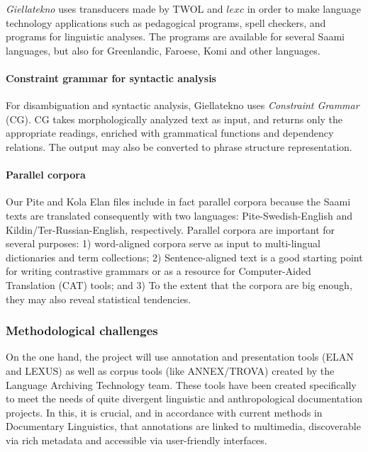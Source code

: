 \documentclass[a4paper,12pt]{article}
\begin{document}
\textit{Giellatekno} uses transducers made by TWOL and $lexc$ in order to make language technology applications such as pedagogical programs, spell checkers, and programs for linguistic analyses. The programs are available for several Saami languages, but also for Greenlandic, Faroese, Komi and other languages.

\paragraph{Constraint grammar for syntactic analysis}
For disambiguation and syntactic analysis, Giellatekno uses \textit{Constraint Grammar} (CG). CG takes morphologically analyzed text as input, and returns only the appropriate readings, enriched with grammatical functions and dependency relations. The output may also be converted to phrase structure representation.

\paragraph{Parallel corpora}
Our Pite and Kola Elan files include in fact parallel corpora because the Saami texts are translated consequently with two languages: Pite-Swedish-English and Kildin/Ter-Russian-English, respectively. Parallel corpora are important for several purposes: 1) word-aligned corpora serve as input to multi-lingual dictionaries and term collections; 2) Sentence-aligned text is a good starting point for writing contrastive grammars or as a resource for Computer-Aided Translation (CAT) tools; and 3) To the extent that the corpora are big enough, they may also reveal statistical tendencies.

\subsubsection{Methodological challenges}
On the one hand, the project will use annotation and presentation tools (ELAN and LEXUS) as well as corpus tools (like ANNEX/TROVA) created by the Language Archiving Technology team. These tools have been created specifically to meet the needs of quite divergent linguistic and anthropological documentation projects. In this, it is crucial, and in accordance with current methods in Documentary Linguistics, that annotations are linked to multimedia, discoverable via rich metadata and accessible via user-friendly interfaces.
\end{document}
